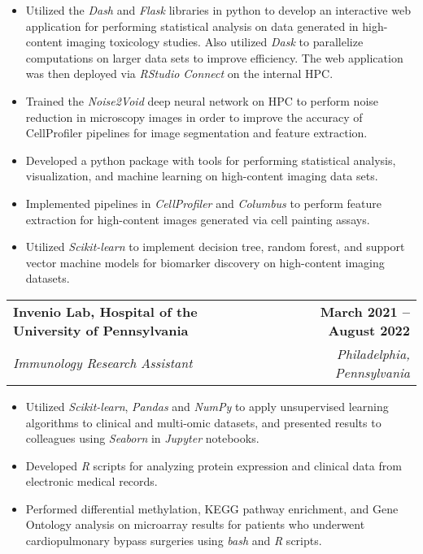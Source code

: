 \documentclass[letterpaper,11pt]{article}
\makeatletter
\newcommand{\resumeItem}[1]{
  \item\small{
    {#1 \vspace{-2pt}}
  }
}
\newcommand{\resumeSubheading}[4]{
  \vspace{-2pt}\item
    \begin{tabular*}{1.0\textwidth}[t]{l@{\extracolsep{\fill}}r}
      \textbf{#1} & \textbf{\small #2} \\
      \textit{\small#3} & \textit{\small #4} \\
    \end{tabular*}\vspace{-7pt}
}
\newcommand{\resumeItemListStart}{\begin{itemize}}
\newcommand{\resumeItemListEnd}{\end{itemize}\vspace{-5pt}}
\makeatother
\begin{document}
    \resumeItemListStart
        \resumeItem{
            Utilized the \textit{Dash} and \textit{Flask} libraries in python to develop 
            an interactive web application for performing statistical analysis on data 
            generated in high-content imaging toxicology studies. Also utilized 
            \textit{Dask} to parallelize computations on larger data sets to improve 
            efficiency. The web application was then deployed via \textit{RStudio Connect} 
            on the internal HPC.
        }
        \resumeItem{
            Trained the \textit{Noise2Void} deep neural network on HPC to perform noise 
            reduction in microscopy images in order to improve the accuracy of CellProfiler
            pipelines for image segmentation and feature extraction.
        }
        \resumeItem{
            Developed a python package with tools for performing statistical analysis, 
            visualization, and machine learning on high-content imaging data sets.
        }
        \resumeItem{
            Implemented pipelines in \textit{CellProfiler} and \textit{Columbus} to 
            perform feature extraction for high-content images generated via cell painting 
            assays.
        }
        \resumeItem{
            Utilized \textit{Scikit-learn} to implement decision tree, random forest, and 
            support vector machine models for biomarker discovery on high-content imaging 
            datasets.
        }
    \resumeItemListEnd
  
\resumeSubheading
    {Invenio Lab, Hospital of the University of Pennsylvania}
    {March 2021 -- August 2022}
    {Immunology Research Assistant}
    {Philadelphia, Pennsylvania}

    \resumeItemListStart
        \resumeItem{
            Utilized \emph{Scikit-learn}, \emph{Pandas} and \emph{NumPy} to apply 
            unsupervised learning algorithms to clinical and multi-omic datasets, and 
            presented results to colleagues using \emph{Seaborn} in \emph{Jupyter} 
            notebooks.
        }
        \resumeItem{
            Developed \emph{R} scripts for analyzing protein expression and clinical data 
            from electronic medical records.
        }
        \resumeItem{
            Performed differential methylation, KEGG pathway enrichment, and Gene Ontology 
            analysis on microarray results for patients who underwent cardiopulmonary 
            bypass surgeries using \emph{bash} and \emph{R} scripts.
        }
    \resumeItemListEnd
  
\end{document}
